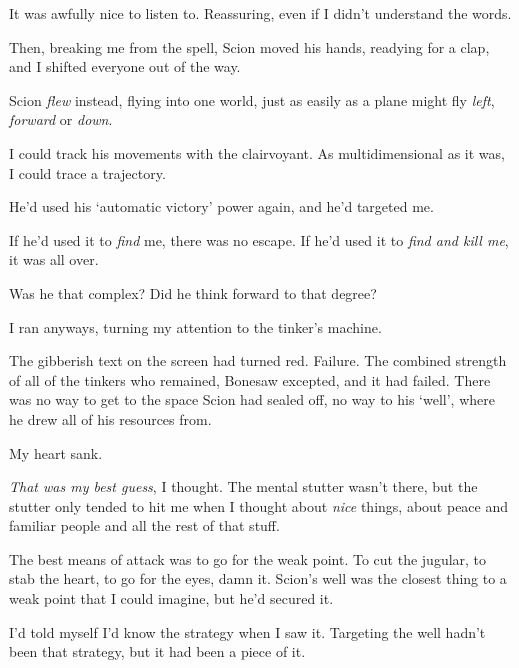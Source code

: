 It was awfully nice to listen to.  Reassuring, even if I didn't understand the words.



Then, breaking me from the spell, Scion moved his hands, readying for a clap, and I shifted everyone out of the way.



Scion \emph{flew} instead, flying into one world, just as easily as a plane might fly \emph{left}, \emph{forward} or \emph{down}.



I could track his movements with the clairvoyant.  As multidimensional as it was, I could trace a trajectory.



He'd used his `automatic victory' power again, and he'd targeted me.



If he'd used it to \emph{find }me, there was no escape.  If he'd used it to \emph{find and kill me}, it was all over.



Was he that complex?  Did he think forward to that degree?



I ran anyways, turning my attention to the tinker's machine.



The gibberish text on the screen had turned red.  Failure.  The combined strength of all of the tinkers who remained, Bonesaw excepted, and it had failed.  There was no way to get to the space Scion had sealed off, no way to his `well', where he drew all of his resources from.



My heart sank.



\emph{That was my best guess}, I thought.  The mental stutter wasn't there, but the stutter only tended to hit me when I thought about \emph{nice} things, about peace and familiar people and all the rest of that stuff.



The best means of attack was to go for the weak point.  To cut the jugular, to stab the heart, to go for the eyes, damn it.  Scion's well was the closest thing to a weak point that I could imagine, but he'd secured it.



I'd told myself I'd know the strategy when I saw it.  Targeting the well hadn't been that strategy, but it had been a piece of it.



